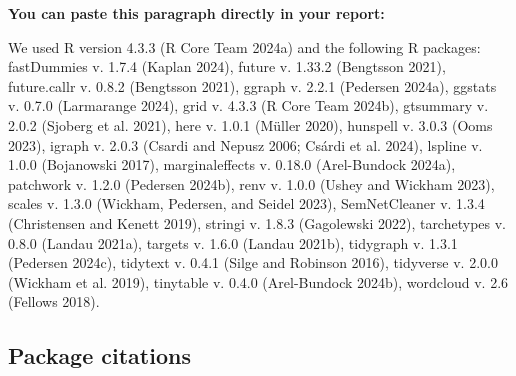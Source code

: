 \documentclass[
]{article}
\begin{document}
\textbf{You can paste this paragraph directly in your report:}

We used R version 4.3.3 (R Core Team 2024a) and the following R
packages: fastDummies v. 1.7.4 (Kaplan 2024), future v. 1.33.2
(Bengtsson 2021), future.callr v. 0.8.2 (Bengtsson 2021), ggraph v.
2.2.1 (Pedersen 2024a), ggstats v. 0.7.0 (Larmarange 2024), grid v.
4.3.3 (R Core Team 2024b), gtsummary v. 2.0.2 (Sjoberg et al. 2021),
here v. 1.0.1 (Müller 2020), hunspell v. 3.0.3 (Ooms 2023), igraph v.
2.0.3 (Csardi and Nepusz 2006; Csárdi et al. 2024), lspline v. 1.0.0
(Bojanowski 2017), marginaleffects v. 0.18.0 (Arel-Bundock 2024a),
patchwork v. 1.2.0 (Pedersen 2024b), renv v. 1.0.0 (Ushey and Wickham
2023), scales v. 1.3.0 (Wickham, Pedersen, and Seidel 2023),
SemNetCleaner v. 1.3.4 (Christensen and Kenett 2019), stringi v. 1.8.3
(Gagolewski 2022), tarchetypes v. 0.8.0 (Landau 2021a), targets v. 1.6.0
(Landau 2021b), tidygraph v. 1.3.1 (Pedersen 2024c), tidytext v. 0.4.1
(Silge and Robinson 2016), tidyverse v. 2.0.0 (Wickham et al. 2019),
tinytable v. 0.4.0 (Arel-Bundock 2024b), wordcloud v. 2.6 (Fellows
2018).

\hypertarget{package-citations}{%
\subsection*{Package citations}\label{package-citations}}
\end{document}

